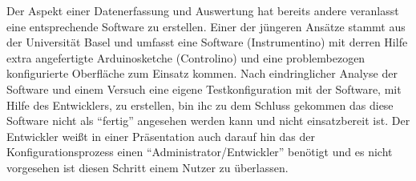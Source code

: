 Der Aspekt einer Datenerfassung und Auswertung hat bereits andere veranlasst 
eine entsprechende Software zu erstellen. Einer der jüngeren Ansätze stammt 
aus der Universität Basel\cite{Instrumentino} und umfasst eine Software 
(Instrumentino) mit derren Hilfe extra angefertigte Arduinosketche (Controlino) 
und eine problembezogen konfigurierte Oberfläche zum Einsatz kommen. 
Nach eindringlicher Analyse der Software und einem Versuch eine eigene 
Testkonfiguration mit der Software, mit Hilfe des Entwicklers, zu erstellen, bin 
ihc zu dem Schluss gekommen das diese Software nicht als ``fertig'' angesehen 
werden kann und nicht einsatzbereit ist. Der Entwickler weißt in einer 
Präsentation  auch darauf hin das der Konfigurationsprozess einen 
``Administrator/Entwickler'' benötigt und es nicht vorgesehen ist diesen Schritt 
einem Nutzer zu überlassen. 